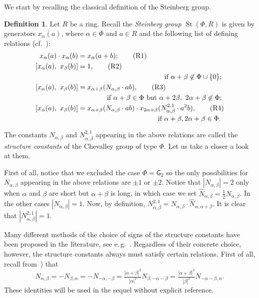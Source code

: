 \documentclass{article}
\numberwithin{equation}{section}
\theoremstyle{definition}
\newtheorem{df}[lemma]{Definition} \Crefname{df}{Definition}{Definitions}
\theoremstyle{remark}
\DeclareMathOperator\St{St}
\begin{document}
We start by recalling the classical definition of the Steinberg group.
\begin{df} \label{def:Steinberg}
Let $R$ be a ring. Recall the {\it Steinberg group $\St(\Phi, R)$} is given by generators $x_\alpha(a)$, where $\alpha \in \Phi$ and $a \in R$ and the following list of defining relations (cf.~\cite{Re75}):
\begin{align}
 x_\alpha(a) \cdot x_\alpha(b)    &= x_\alpha(a+b); \tag{R1} \label{R1} \\
 [x_\alpha(a),\ x_\beta(b)] &= 1, \tag{R2} \label{R2} \\ 
 \multispan2{\hfil if $\alpha + \beta \not\in\Phi \cup \{0\};$} \nonumber \\
 [x_\alpha(a),\ x_\beta(b)] &= x_{\alpha + \beta}(N_{\alpha,\beta} \cdot ab), \tag{R3} \label{R3} \\
 \multispan2{\hfill if $\alpha+\beta\in\Phi$ but $\alpha+2\beta,\ 2\alpha+\beta\not\in\Phi;$} \nonumber \\
 [x_\alpha(a),\ x_\beta(b)] &= x_{\alpha + \beta}(N_{\alpha,\beta} \cdot ab) \cdot x_{2\alpha+\beta}(N_{\alpha,\beta}^{2,1} \cdot a^2b), \tag{R4} \label{R4} \\ \multispan2{ \hfill if $\alpha+\beta,2\alpha+\beta\in\Phi$.} \nonumber  \end{align}
\end{df}
The constants $N_{\alpha,\beta}$ and $N_{\alpha,\beta}^{2,1}$ appearing in the above relations are called the {\it structure constants} of the Chevalley group of type $\Phi$. Let us take a closer a look at them.

First of all, notice that we excluded the case $\Phi=\mathsf{G}_2$ so the only possibilities for $N_{\alpha, \beta}$ appearing in the above relations are $\pm 1$ or $\pm 2$.
Notice that $|N_{\alpha,\beta}| = 2$ only when $\alpha$ and $\beta$ are short but $\alpha+\beta$ is long, in which case we set $\widehat{N}_{\alpha, \beta} = \frac{1}{2} N_{\alpha, \beta}$.
In the other cases $|N_{\alpha, \beta}| = 1$.
Now, by definition, $N_{\alpha,\beta}^{2,1} = N_{\alpha,\beta} \cdot \widehat{N}_{\alpha, \alpha+\beta}$.
It is clear that $|N_{\alpha,\beta}^{2,1}|=1$.

Many different methods of the choice of signs of the structure constants have been proposed in the literature, see e.\,g.~\cite{VP}. 
Regardless of their concrete choice, however, the structure constants always must satisfy certain relations. First of all, recall from~\cite[\S~14]{VP}) that
\begin{equation} \label{eq:sc-ids-sl} N_{\alpha, \beta} = -N_{\beta,\alpha} = - N_{-\alpha, -\beta} = \tfrac{|\alpha+\beta|^2}{|\alpha|^2} N_{\beta, -\alpha-\beta} = \tfrac{|\alpha+\beta|^2}{|\beta|^2} N_{-\alpha-\beta, \alpha}. \end{equation}
These identities will be used in the sequel without explicit reference. 
\end{document}
